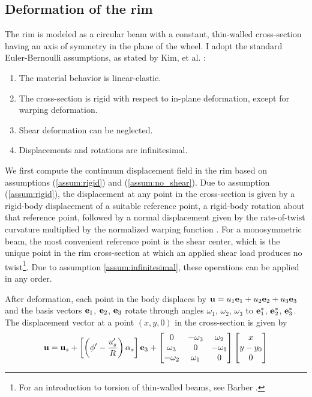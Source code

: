 \documentclass[\rootdir/thesis.tex]{subfiles}
\begin{document}
\subsection{Deformation of the rim}

The rim is modeled as a circular beam with a constant, thin-walled cross-section having an axis of symmetry in the plane of the wheel. I adopt the standard Euler-Bernoulli assumptions, as stated by Kim, et al. \cite{KimMinSuh}:

\begin{enumerate}
	\item{The material behavior is linear-elastic.}\label{assum:elastic}
	\item{The cross-section is rigid with respect to in-plane deformation, except for warping deformation.}\label{assum:rigid}
	\item{Shear deformation can be neglected.}\label{assum:no_shear} 
	\item{Displacements and rotations are infinitesimal.}\label{assum:infinitesimal}
\end{enumerate}

We first compute the continuum displacement field in the rim based on assumptions (\ref{assum:rigid}) and (\ref{assum:no_shear}). Due to assumption (\ref{assum:rigid}), the displacement at any point in the cross-section is given by a rigid-body displacement of a suitable reference point, a rigid-body rotation about that reference point, followed by a normal displacement given by the rate-of-twist curvature multiplied by the normalized warping function \cite{warping mechanics}. For a monosymmetric beam, the most convenient reference point is the shear center, which is the unique point in the rim cross-section at which an applied shear load produces no twist\footnote{For an introduction to torsion of thin-walled beams, see Barber \cite{Barber}.}. Due to assumption \ref{assum:infinitesimal}, these operations can be applied in any order.

After deformation, each point in the body displaces by $\mathbf{u}= u_1\mathbf{e}_1 + u_2\mathbf{e}_2 + u_3\mathbf{e}_3$ and the basis vectors $\mathbf{e}_1$, $\mathbf{e}_2$, $\mathbf{e}_3$ rotate through angles $\omega_1$, $\omega_2$, $\omega_3$ to $\mathbf{e}_1^*$, $\mathbf{e}_2^*$, $\mathbf{e}_3^*$. The displacement vector at a point $(x, y, 0)$ in the cross-section is given by
\begin{equation}
\label{eq:u}
\mathbf{u} = \mathbf{u}_s + \left[\left(\phi' - \frac{u_s'}{R}\right)\alpha_s\right]\mathbf{e}_3 +
\begin{bmatrix}
0        & -\omega_3& \omega_2\\
\omega_3 & 0        & -\omega_1\\
-\omega_2& \omega_1 & 0
\end{bmatrix}
\begin{bmatrix}x\\y - y_0\\0\end{bmatrix}
\end{equation}
\end{document}

